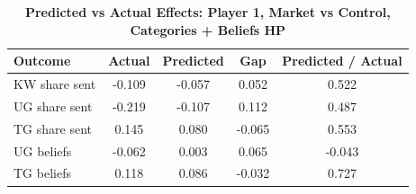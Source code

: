 \begin{table}[!htbp]
\centering
\caption{\textbf{Predicted vs Actual Effects: Player 1, Market vs Control, Categories + Beliefs HP}}
\label{tab:cats_hp_market_vs_control_fullpooled_p1_fit}
\begin{tabular}{lcccc}
\toprule
Outcome & Actual & Predicted & Gap & Predicted / Actual \\
\midrule
KW share sent & -0.109 & -0.057 & 0.052 & 0.522 \\
UG share sent & -0.219 & -0.107 & 0.112 & 0.487 \\
TG share sent & 0.145 & 0.080 & -0.065 & 0.553 \\
UG beliefs & -0.062 & 0.003 & 0.065 & -0.043 \\
TG beliefs & 0.118 & 0.086 & -0.032 & 0.727 \\
\bottomrule
\end{tabular}
\end{table}
